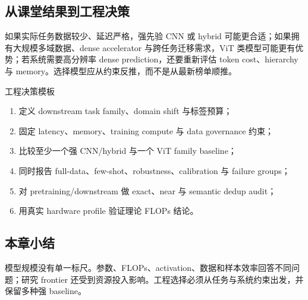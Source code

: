 \subsection{从课堂结果到工程决策}

如果实际任务数据较少、延迟严格，强先验 CNN 或 hybrid 可能更合适；如果拥有大规模多域数据、dense accelerator 与跨任务迁移需求，ViT 类模型可能更有优势；若系统需要高分辨率 dense prediction，还要重新评估 token cost、hierarchy 与 memory。选择模型应从约束反推，而不是从最新榜单顺推。

\begin{importantbox}{工程决策模板}
\begin{enumerate}
  \item 定义 downstream task family、domain shift 与标签预算；
  \item 固定 latency、memory、training compute 与 data governance 约束；
  \item 比较至少一个强 CNN/hybrid 与一个 ViT family baseline；
  \item 同时报告 full-data、few-shot、robustness、calibration 与 failure groups；
  \item 对 pretraining/downstream 做 exact、near 与 semantic dedup audit；
  \item 用真实 hardware profile 验证理论 FLOPs 结论。
\end{enumerate}
\end{importantbox}

\subsection{本章小结}

模型规模没有单一标尺。参数、FLOPs、activation、数据和样本效率回答不同问题；研究 frontier 还受到资源投入影响。工程选择必须从任务与系统约束出发，并保留多种强 baseline。

